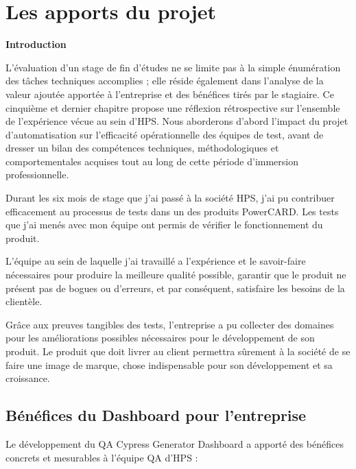 \newpage
\chapter{Les apports du projet}
\vspace{1cm}
\minitoc
\newpage

\textbf{Introduction}

L'évaluation d'un stage de fin d'études ne se limite pas à la simple énumération des tâches techniques accomplies ; elle réside également dans l'analyse de la valeur ajoutée apportée à l'entreprise et des bénéfices tirés par le stagiaire. Ce cinquième et dernier chapitre propose une réflexion rétrospective sur l'ensemble de l'expérience vécue au sein d'HPS. Nous aborderons d'abord l'impact du projet d'automatisation sur l'efficacité opérationnelle des équipes de test, avant de dresser un bilan des compétences techniques, méthodologiques et comportementales acquises tout au long de cette période d'immersion professionnelle.
\vspace{10pt}

Durant les six mois de stage que j'ai passé à la société HPS, j'ai pu contribuer efficacement au processus de tests dans un des produits PowerCARD. Les tests que j'ai menés avec mon équipe ont permis de vérifier le fonctionnement du produit.

L'équipe au sein de laquelle j'ai travaillé a l'expérience et le savoir-faire nécessaires pour produire la meilleure qualité possible, garantir que le produit ne présent pas de bogues ou d'erreurs, et par conséquent, satisfaire les besoins de la clientèle.

Grâce aux preuves tangibles des tests, l'entreprise a pu collecter des domaines pour les améliorations possibles nécessaires pour le développement de son produit. Le produit que doit livrer au client permettra sûrement à la société de se faire une image de marque, chose indispensable pour son développement et sa croissance.

\section{Bénéfices du Dashboard pour l'entreprise}

Le développement du QA Cypress Generator Dashboard a apporté des bénéfices concrets et mesurables à l'équipe QA d'HPS :

